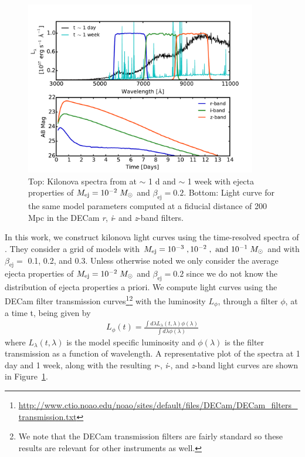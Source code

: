 \begin{figure}[t!]
\centering
\includegraphics[width=0.9\textwidth]{./figs/chapter2/ch2_f1.pdf}
\caption{Top: Kilonova spectra from \citet{BarnesKasen13} at $\sim$ 1 d and $\sim$ 1 week with ejecta properties of $M_{\rm ej} =10^{-2}\;M_{\odot}$ and $\beta_{\text{ej}} = 0.2$. Bottom: Light curve for the same model parameters computed at a fiducial distance of 200 Mpc in the DECam {\em r}, {\em i}- and {\em z}-band filters. \vspace{10pt}}
\label{fig:ch2_kilosample}
\end{figure}

In this work, we construct kilonova light curves using the time-resolved spectra of \citet{BarnesKasen13}. They consider a grid of models with $M_{\rm ej} = 10^{-3}\;, 10^{-2} \;, \text{ and } 10^{-1} \;M_{\odot}$ and with $\beta_{\text{ej}} = $ 0.1, 0.2, and 0.3. Unless otherwise noted we only consider the average ejecta properties of $M_{\rm ej} =10^{-2}\;M_{\odot}$ and $\beta_{\text{ej}} = 0.2$ since we do not know the distribution of ejecta properties a priori. We compute light curves using the DECam filter transmission curves\footnote{\url{http://www.ctio.noao.edu/noao/sites/default/files/DECam/DECam_filters_transmission.txt}}\footnote{We note that the DECam transmission filters are fairly standard so these results are relevant for other instruments as well.} with the luminosity $L_{\phi}$, through a filter $\phi$, at a time t, being given by
\begin{align}
\label{eq:LCint}
L_{\phi}(t) = \frac{\int d\lambda L_{\lambda}(t,\lambda) \phi(\lambda)}{\int d\lambda \phi(\lambda)}
\end{align}
\noindent where $L_{\lambda}(t,\lambda)$ is the model specific luminosity and $\phi(\lambda)$ is the filter transmission as a function of wavelength. A representative plot of the spectra at 1 day and 1 week, along with the resulting {\em r}-, {\em i}-, and {\em z}-band light curves are shown in Figure~\ref{fig:ch2_kilosample}.

